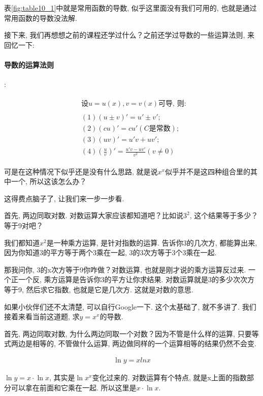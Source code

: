 表\ref{fig:table10_1}中就是常用函数的导数, 似乎这里面没有我们可用的, 也就是通过常用函数的导数没法解. 

接下来, 我们再想想之前的课程还学过什么？之前还学过导数的一些运算法则, 来回忆一下: 

\paragraph{导数的运算法则}:

\begin{align*}
	\begin{split}
    & \mbox{设} u = u(x), v = v(x)\mbox{可导, 则: }\\ \\
    & (1) (u\pm v)' = u'\pm v' ; \\
    & (2) (cu)' = cu' (C\mbox{是常数}); \\
    & (3) (uv)' = u'v+uv'; \\
    & (4)(\frac{u}{v})' = \frac{u'v-uv'}{v^2}(v \ne 0)
	\end{split}
\end{align*}

可是在这种情况下似乎还是没有什么思路, 就是说$x^x$似乎并不是这四种组合里的其中一个, 所以这该怎么办？

这得费点脑子了, 让我们来一步一步看. 

首先, 两边同取对数. 对数运算大家应该都知道吧？比如说$3^2$, 这个结果等于多少？等于9对吧？

我们都知道$x^2$是一种乘方运算, 是针对指数的运算. 告诉你3的几次方, 都能算出来, 因为你知道3的平方等于两个3乘在一起, 3的3次方等于3个3乘在一起. 

那我问你, 3的x次方等于9你咋做？对数运算, 也就是刚才说的乘方运算反过来. 一个正一个反, 乘方运算是告诉你3的平方让你求结果. 对数运算就是3的多少次次方等于9, 然后求它指数, 也就是它是几次方. 这就是对数的意思. 

如果小伙伴们还不太清楚, 可以自行Google一下. 这个太基础了, 就不多讲了. 我们接着来看当前这道题, 求$y=x^x$的导数. 

首先, 两边同取对数, 为什么两边同取一个对数？因为不管是什么样的运算, 只要等式两边是相等的, 不管做什么运算, 两边做同样的一个运算相等的结果仍然不会变.

\begin{align*}
  \ln y = x ln x
\end{align*}

$\ln y = x \cdot \ln x$, 其实是$\ln x^x$变化过来的. 对数运算有个特点, 就是x上面的指数部分可以拿在前面和它乘在一起. 所以这里是$x \cdot \ln x$.

